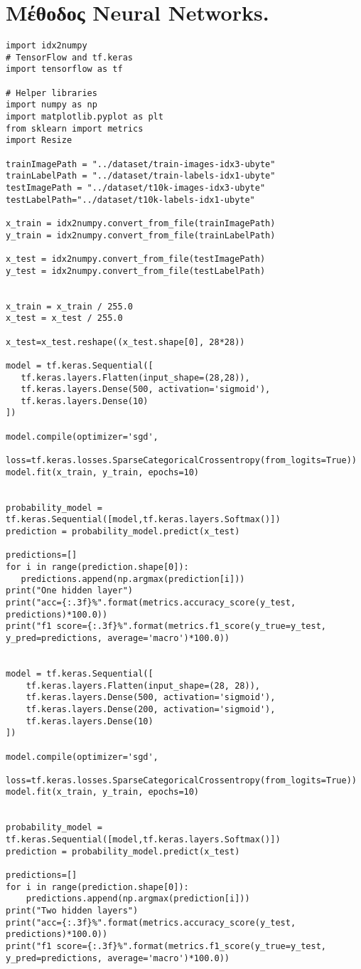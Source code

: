 \documentclass{article}[40pt]
\newcommand{\en}{\selectlanguage{english}}
\newcommand{\gr}{\selectlanguage{greek}}
\begin{document}
\section{\gr Μέθοδος \en Neural Networks.}
\begin{lstlisting}[style=PStyle]
import idx2numpy
# TensorFlow and tf.keras
import tensorflow as tf

# Helper libraries
import numpy as np
import matplotlib.pyplot as plt
from sklearn import metrics
import Resize

trainImagePath = "../dataset/train-images-idx3-ubyte"
trainLabelPath = "../dataset/train-labels-idx1-ubyte"
testImagePath = "../dataset/t10k-images-idx3-ubyte"
testLabelPath="../dataset/t10k-labels-idx1-ubyte"

x_train = idx2numpy.convert_from_file(trainImagePath)
y_train = idx2numpy.convert_from_file(trainLabelPath)

x_test = idx2numpy.convert_from_file(testImagePath)
y_test = idx2numpy.convert_from_file(testLabelPath)


x_train = x_train / 255.0
x_test = x_test / 255.0

x_test=x_test.reshape((x_test.shape[0], 28*28))

model = tf.keras.Sequential([
   tf.keras.layers.Flatten(input_shape=(28,28)),
   tf.keras.layers.Dense(500, activation='sigmoid'),
   tf.keras.layers.Dense(10)
])

model.compile(optimizer='sgd',
               loss=tf.keras.losses.SparseCategoricalCrossentropy(from_logits=True))
model.fit(x_train, y_train, epochs=10)


probability_model = tf.keras.Sequential([model,tf.keras.layers.Softmax()])
prediction = probability_model.predict(x_test)

predictions=[]
for i in range(prediction.shape[0]):
   predictions.append(np.argmax(prediction[i]))
print("One hidden layer")
print("acc={:.3f}%".format(metrics.accuracy_score(y_test, predictions)*100.0))
print("f1 score={:.3f}%".format(metrics.f1_score(y_true=y_test, y_pred=predictions, average='macro')*100.0))


model = tf.keras.Sequential([
    tf.keras.layers.Flatten(input_shape=(28, 28)),
    tf.keras.layers.Dense(500, activation='sigmoid'),
    tf.keras.layers.Dense(200, activation='sigmoid'),
    tf.keras.layers.Dense(10)
])

model.compile(optimizer='sgd',
                loss=tf.keras.losses.SparseCategoricalCrossentropy(from_logits=True))
model.fit(x_train, y_train, epochs=10)


probability_model = tf.keras.Sequential([model,tf.keras.layers.Softmax()])
prediction = probability_model.predict(x_test)

predictions=[]
for i in range(prediction.shape[0]):
    predictions.append(np.argmax(prediction[i]))
print("Two hidden layers")
print("acc={:.3f}%".format(metrics.accuracy_score(y_test, predictions)*100.0))
print("f1 score={:.3f}%".format(metrics.f1_score(y_true=y_test, y_pred=predictions, average='macro')*100.0))
\end{lstlisting}
\end{document}
